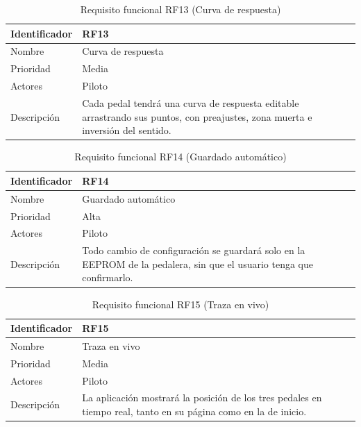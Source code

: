 \begin{table}[H]
	\centering
	\renewcommand{\arraystretch}{2}
	\begin{tabular}{|l|p{10cm}|}
		\hline
		Identificador & RF13 \\
		\hline
		Nombre & Curva de respuesta \\
		\hline
		Prioridad & Media \\
		\hline
		Actores & Piloto \\
		\hline
		Descripción & Cada pedal tendrá una curva de respuesta editable arrastrando sus puntos, con preajustes, zona muerta e inversión del sentido. \\
		\hline
	\end{tabular}
	\caption{Requisito funcional RF13 (Curva de respuesta)}
	\label{tab:rf13}
\end{table}

\begin{table}[H]
	\centering
	\renewcommand{\arraystretch}{2}
	\begin{tabular}{|l|p{10cm}|}
		\hline
		Identificador & RF14 \\
		\hline
		Nombre & Guardado automático \\
		\hline
		Prioridad & Alta \\
		\hline
		Actores & Piloto \\
		\hline
		Descripción & Todo cambio de configuración se guardará solo en la EEPROM de la pedalera, sin que el usuario tenga que confirmarlo. \\
		\hline
	\end{tabular}
	\caption{Requisito funcional RF14 (Guardado automático)}
	\label{tab:rf14}
\end{table}

\begin{table}[H]
	\centering
	\renewcommand{\arraystretch}{2}
	\begin{tabular}{|l|p{10cm}|}
		\hline
		Identificador & RF15 \\
		\hline
		Nombre & Traza en vivo \\
		\hline
		Prioridad & Media \\
		\hline
		Actores & Piloto \\
		\hline
		Descripción & La aplicación mostrará la posición de los tres pedales en tiempo real, tanto en su página como en la de inicio. \\
		\hline
	\end{tabular}
	\caption{Requisito funcional RF15 (Traza en vivo)}
	\label{tab:rf15}
\end{table}

